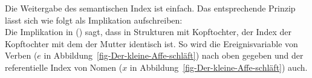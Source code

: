 Die Weitergabe des semantischen Index ist einfach. Das entsprechende Prinzip lässt sich wie folgt als Implikation
aufschreiben:
\ea
\label{Semantik-Index-headed-phrase}
 \impl\\
\z
Die Implikation in () sagt, dass in Strukturen mit Kopftochter, der Index der Kopftochter mit
dem der Mutter identisch ist. So wird die Ereignisvariable von Verben ($e$ in Abbildung~\ref{fig-Der-kleine-Affe-schläft}) nach oben gegeben und der
referentielle Index von Nomen ($x$ in Abbildung~\ref{fig-Der-kleine-Affe-schläft}) auch.

